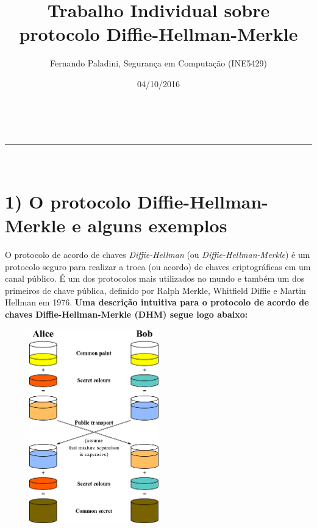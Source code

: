 \documentclass[a4paper,11pt]{article}
\makeatletter
\newcommand{\linia}{\rule{\linewidth}{0.5pt}}
\theoremstyle{mytheor}
\renewcommand{\maketitle}{
\begin{center}
\vspace{2ex}
{\huge \textsc{\@title}}
\vspace{1ex}
\\
\linia\\
\@author \hfill \@date
\vspace{4ex}
\end{center}
}
\makeatother
\begin{document}
\title{Trabalho Individual sobre protocolo Diffie-Hellman-Merkle}

\author{Fernando Paladini, Segurança em Computação (INE5429)}

\date{04/10/2016}

\maketitle

\section*{1) O protocolo Diffie-Hellman-Merkle e alguns exemplos}

O protocolo de acordo de chaves \textit{Diffie-Hellman} (ou \textit{Diffie-Hellman-Merkle}) é um protocolo seguro para realizar a troca (ou acordo) de chaves criptográficas em um canal público. É um dos protocolos mais utilizados no mundo e também um dos primeiros de chave pública, definido por Ralph Merkle, Whitfield Diffie e Martin Hellman em 1976. 
\newline\newline
\noindent \textbf{Uma descrição intuitiva para o protocolo de acordo de chaves Diffie-Hellman-Merkle (DHM) segue logo abaixo:}

\begin{figure}
    \centering
    \includegraphics[width=0.5\textwidth]{intuitivo}
\end{figure}
\end{document}
